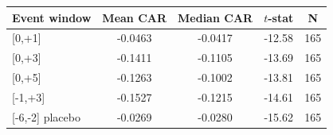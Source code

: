 \begin{tabular}{lcccc}
\toprule
Event window & Mean CAR & Median CAR & $t$-stat & N \\
\midrule
{[0,+1]} & -0.0463 & -0.0417 & -12.58 & 165 \\
{[0,+3]} & -0.1411 & -0.1105 & -13.69 & 165 \\
{[0,+5]} & -0.1263 & -0.1002 & -13.81 & 165 \\
{[-1,+3]} & -0.1527 & -0.1215 & -14.61 & 165 \\
{[-6,-2] placebo} & -0.0269 & -0.0280 & -15.62 & 165 \\
\bottomrule
\end{tabular}